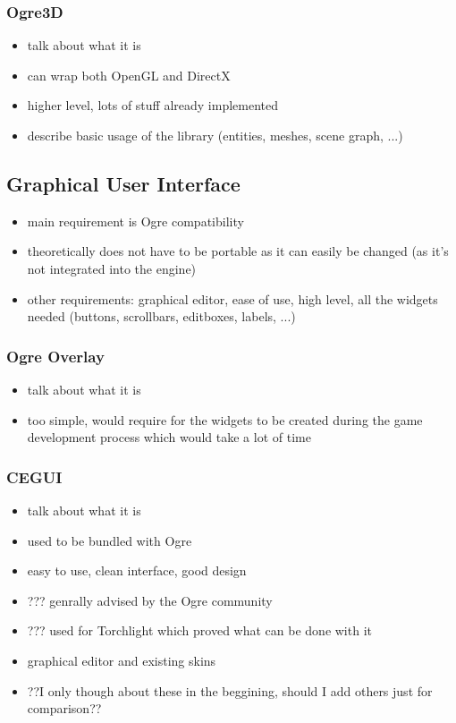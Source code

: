 \subsubsection{Ogre3D}

\begin{itemize}
    \item talk about what it is
    \item can wrap both OpenGL and DirectX
    \item higher level, lots of stuff already implemented
    \item describe basic usage of the library (entities, meshes, scene graph, ...) 
\end{itemize}

\subsection{Graphical User Interface}

\begin{itemize}
    \item main requirement is Ogre compatibility
    \item theoretically does not have to be portable as it can easily be changed
        (as it's not integrated into the engine)
    \item other requirements: graphical editor, ease of use, high level, all the
        widgets needed (buttons, scrollbars, editboxes, labels, ...)

\end{itemize}

\subsubsection{Ogre Overlay}

\begin{itemize}
    \item talk about what it is
    \item too simple, would require for the widgets to be created during
        the game development process which would take a lot of time
\end{itemize}

\subsubsection{CEGUI}

\begin{itemize}
    \item talk about what it is
    \item used to be bundled with Ogre
    \item easy to use, clean interface, good design
    \item ??? genrally advised by the Ogre community
    \item ??? used for Torchlight which proved what can be done with it
    \item graphical editor and existing skins
    \item ??I only though about these in the beggining, should I add
        others just for comparison??
\end{itemize}

